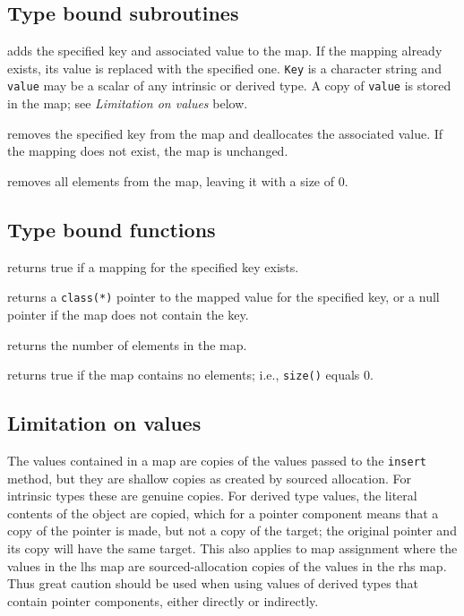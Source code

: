 \documentclass[11pt]{article}
\begin{document}
\subsection{Type bound subroutines}

\begin{description}[style=nextline]\setlength{\itemsep}{0pt}
\item[\texttt{insert(key,value)}]
  adds the specified key and associated value to the map.  If the mapping
  already exists, its value is replaced with the specified one.
  \texttt{Key} is a character string and \texttt{value} may be a scalar of
  any intrinsic or derived type.  A copy of \texttt{value} is stored in the
  map; see \emph{Limitation on values} below.
\item[\texttt{remove(key)}]
  removes the specified key from the map and deallocates the associated value.
  If the mapping does not exist, the map is unchanged.
\item[\texttt{clear()}]
  removes all elements from the map, leaving it with a size of 0.
\end{description}

\subsection{Type bound functions}
\begin{description}[style=nextline]\setlength{\itemsep}{0pt}
\item[\texttt{mapped(key)}]
  returns true if a mapping for the specified key exists.
\item[\texttt{value(key)}]
  returns a \texttt{class(*)} pointer to the mapped value for the specified
  key, or a null pointer if the map does not contain the key.
\item[\texttt{size()}]
  returns the number of elements in the map.
\item[\texttt{empty()}]
  returns true if the map contains no elements; i.e., \texttt{size()} equals 0.
\end{description}

\subsection{Limitation on values}
The values contained in a map are copies of the values passed to the
\texttt{insert} method, but they are shallow copies as created
by sourced allocation.  For intrinsic types these are genuine copies.  For
derived type values, the literal contents of the object are copied, which
for a pointer component means that a copy of the pointer is made, but not
a copy of the target; the original pointer and its copy will have the same
target.  This also applies to map assignment where the values in the lhs
map are sourced-allocation copies of the values in the rhs map.  Thus
great caution should be used when using values of derived types that contain
pointer components, either directly or indirectly.
\end{document}
